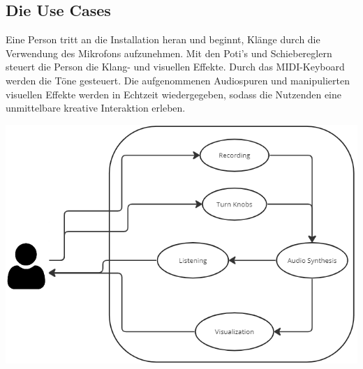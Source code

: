 \documentclass[12pt]{scrartcl}%
\theoremstyle{nonumberplain}
\begin{document}
\subsection{Die Use Cases}
Eine Person tritt an die Installation heran und beginnt, Klänge durch die Verwendung des Mikrofons aufzunehmen. Mit den Poti's und Schiebereglern steuert die Person die Klang- und visuellen Effekte. Durch das MIDI-Keyboard werden die Töne gesteuert. Die aufgenommenen Audiospuren und manipulierten visuellen Effekte werden in Echtzeit wiedergegeben, sodass die Nutzenden eine unmittelbare kreative Interaktion erleben.
\begin{center}
 \includegraphics[scale=0.4]{usecases2.png}
\end{center}
\end{document}
